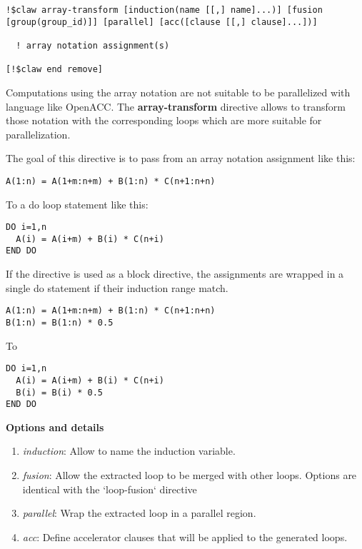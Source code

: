 \documentclass{article}
\begin{document}
\begin{lstlisting}
!$claw array-transform [induction(name [[,] name]...)] [fusion [group(group_id)]] [parallel] [acc([clause [[,] clause]...])]

  ! array notation assignment(s) 
  
[!$claw end remove]
\end{lstlisting}

Computations using the array notation are not suitable to be parallelized with
language like OpenACC. The \textbf{array-transform} directive allows to transform those
notation with the corresponding loops which are more suitable for
parallelization.

The goal of this directive is to pass from an array notation assignment like
this:

\begin{lstlisting}
A(1:n) = A(1+m:n+m) + B(1:n) * C(n+1:n+n)
\end{lstlisting}

To a do loop statement like this:

\begin{lstlisting}
DO i=1,n
  A(i) = A(i+m) + B(i) * C(n+i)
END DO
\end{lstlisting}

If the directive is used as a block directive, the assignments are wrapped in
a single do statement if their induction range match.

\begin{lstlisting}
A(1:n) = A(1+m:n+m) + B(1:n) * C(n+1:n+n)
B(1:n) = B(1:n) * 0.5
\end{lstlisting}

To

\begin{lstlisting}
DO i=1,n
  A(i) = A(i+m) + B(i) * C(n+i)
  B(i) = B(i) * 0.5
END DO
\end{lstlisting}


\textbf{Options and details}
\begin{enumerate}
\item \textit{induction}: Allow to name the induction variable.
\item \textit{fusion}: Allow the extracted loop to be merged with other loops. Options 
are identical with the `loop-fusion` directive
\item \textit{parallel}: Wrap the extracted loop in a parallel region.
\item \textit{acc}: Define accelerator clauses that will be applied to the generated loops.
\end{enumerate}
\end{document}
